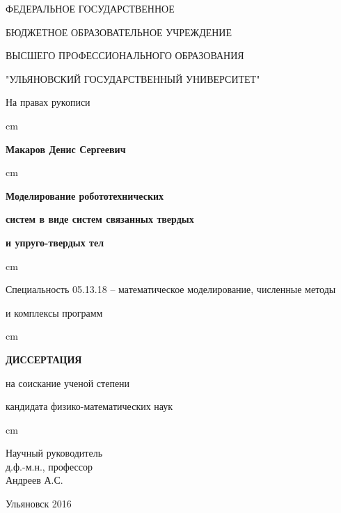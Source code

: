 \thispagestyle{empty}
\centerline{ФЕДЕРАЛЬНОЕ ГОСУДАРСТВЕННОЕ }
\centerline{БЮДЖЕТНОЕ ОБРАЗОВАТЕЛЬНОЕ УЧРЕЖДЕНИЕ}
\centerline{ВЫСШЕГО ПРОФЕССИОНАЛЬНОГО ОБРАЗОВАНИЯ}
\centerline{ "УЛЬЯНОВСКИЙ  ГОСУДАРСТВЕННЫЙ УНИВЕРСИТЕТ" }

\vglue 2cm
\par
\begin{flushright}
На правах рукописи
\end{flushright}


 cm \centerline{\bf Макаров Денис Сергеевич}

 cm \centerline{\bf Моделирование робототехнических }
\centerline{\bf систем в виде систем связанных твердых}
\centerline{\bf и упруго-твердых тел}


 cm \centerline{Специальность 05.13.18 -- математическое моделирование, численные методы}
\centerline{ и комплексы программ}
 cm \centerline{\bf ДИССЕРТАЦИЯ}
\vglue 0.5cm \centerline{ на соискание ученой степени}
\centerline{ кандидата физико-математических наук}  cm

\begin{flushright}
Научный руководитель  \\ 
д.ф.-м.н., профессор\\ 
Андреев А.С.\\
\end{flushright}

\vglue 1.5cm \centerline{Ульяновск  2016}

